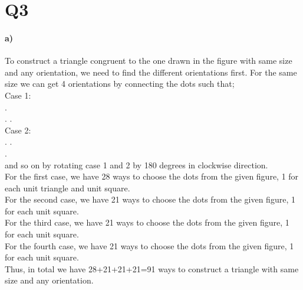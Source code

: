 \documentclass[11pt]{article}
\begin{document}
\section*{Q3}
\paragraph{\textbf{a)}}

To construct a triangle congruent to the one drawn in the figure with same size and any orientation, we need to find the different orientations first. 
For the same size we can get 4 orientations by connecting the dots such that;\\
Case 1:\\
 . \\ 
.   .\\
Case 2:\\
.   .\\
.\\ 
and so on by rotating case 1 and 2 by 180 degrees in clockwise direction.\\
For the first case, we have 28 ways to choose the dots from the given figure, 1 for each unit triangle and unit square. \\
For the second case, we have 21 ways to choose the dots from the given figure, 1 for each unit square.\\
For the third case, we have 21 ways to choose the dots from the given figure, 1 for each unit square.\\
For the fourth case, we have 21 ways to choose the dots from the given figure, 1 for each unit square.\\
Thus, in total we have 28+21+21+21=91 ways to construct a triangle with same size and any orientation.
\end{document}
